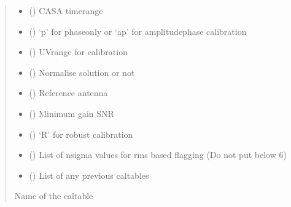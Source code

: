 \documentclass[letterpaper,10pt,english]{sphinxmanual}
\begin{document}
\begin{fulllineitems}
\begin{fulllineitems}
\begin{quote}
\begin{description}
\begin{itemize}
\item {} 
\sphinxAtStartPar
{} () \textendash{} CASA timerange

\item {} 
\sphinxAtStartPar
{} () \textendash{} ‘p’ for phase\sphinxhyphen{}only or ‘ap’ for amplitude\sphinxhyphen{}phase calibration

\item {} 
\sphinxAtStartPar
{} () \textendash{} UV\sphinxhyphen{}range for calibration

\item {} 
\sphinxAtStartPar
{} () \textendash{} Normalise solution or not

\item {} 
\sphinxAtStartPar
{} () \textendash{} Reference antenna

\item {} 
\sphinxAtStartPar
{} () \textendash{} Minimum gain SNR

\item {} 
\sphinxAtStartPar
{} () \textendash{} ‘R’ for robust calibration

\item {} 
\sphinxAtStartPar
{} () \textendash{} List of n\sphinxhyphen{}sigma values for rms based flagging (Do not put below 6)

\item {} 
\sphinxAtStartPar
{} () \textendash{} List of any previous caltables

\end{itemize}

\item[{Returns}] \leavevmode
\sphinxAtStartPar
Name of the caltable


\end{description}
\end{quote}
\end{fulllineitems}
\end{fulllineitems}
\end{document}
